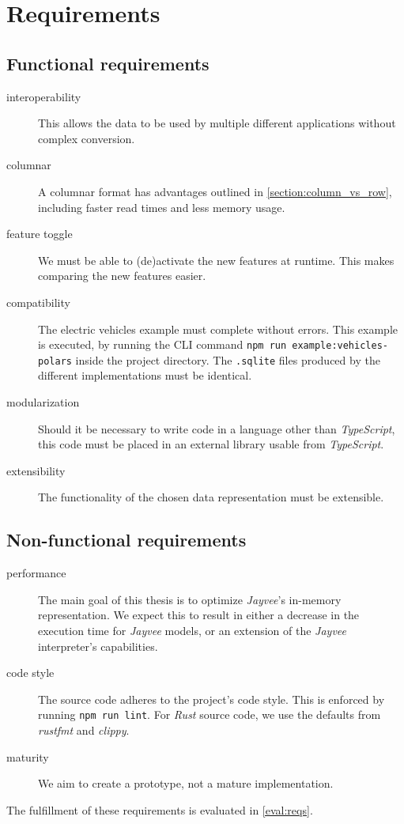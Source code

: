 \chapter{Requirements}
\label{section:Requirements}

\section{Functional requirements}
\label{subsection:FunctionalRequirements}

\begin{description}
	\item[interoperability] This allows the data to be used by multiple different applications without complex conversion.
	\item[columnar] A columnar format has advantages outlined in \autoref{section:column_vs_row}, including faster read times and less memory usage.
	\item[feature toggle] We must be able to (de)activate the new features at runtime.
	      This makes comparing the new features easier.
	\item[compatibility]  The electric vehicles example must complete without errors.
	      This example is executed, by running the \ac{CLI} command \Verb|npm run example:vehicles-polars| inside the project directory.
	      The \Verb|.sqlite| files produced by the different implementations must be identical.
	\item[modularization] Should it be necessary to write code in a language other than \emph{TypeScript}, this code must be placed in an external library usable from \emph{TypeScript}.
	\item[extensibility] The functionality of the chosen data representation must be extensible.
\end{description}

\section{Non-functional requirements}
\label{subsection:NonFunctionalRequirements}

\begin{description}
	\item[performance] The main goal of this thesis is to optimize \emph{Jayvee}'s in-memory representation.
	      We expect this to result in either a decrease in the execution time for \emph{Jayvee} models, or an extension of the \emph{Jayvee} interpreter's capabilities.
	      \pagebreak
	\item[code style] The source code adheres to the project's code style.
	      This is enforced by running \Verb|npm run lint|.
	      For \emph{Rust} source code, we use the defaults from \emph{rustfmt} and \emph{clippy}.
	\item[maturity] We aim to create a prototype, not a mature implementation.
\end{description}

The fulfillment of these requirements is evaluated in \autoref{eval:reqs}.
